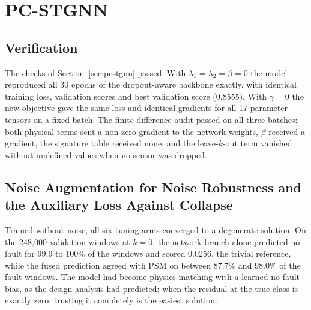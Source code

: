 \documentclass[MTech]{ugthesis}
\begin{document}
\section{PC-STGNN}
\label{sec:pcresults}

\subsection{Verification}

The checks of Section~\ref{sec:pcstgnn} passed. With $\lambda_1=\lambda_2=\beta=0$ the model reproduced all 30 epochs of the dropout-aware backbone exactly, with identical training loss, validation scores and best validation score (0.8555). With $\gamma=0$ the new objective gave the same loss and identical gradients for all 17 parameter tensors on a fixed batch. The finite-difference audit passed on all three batches: both physical terms sent a non-zero gradient to the network weights, $\beta$ received a gradient, the signature table received none, and the leave-$k$-out term vanished without undefined values when no sensor was dropped.

\subsection{Noise Augmentation for Noise Robustness and the Auxiliary Loss Against Collapse}

Trained without noise, all six tuning arms converged to a degenerate solution. On the 248,000 validation windows at $k=0$, the network branch alone predicted no fault for 99.9 to 100\% of the windows and scored 0.0256, the trivial reference, while the fused prediction agreed with \ac{PSM} on between 87.7\% and 98.0\% of the fault windows. The model had become physics matching with a learned no-fault bias, as the design analysis had predicted: when the residual at the true class is exactly zero, trusting it completely is the easiest solution.
\end{document}
